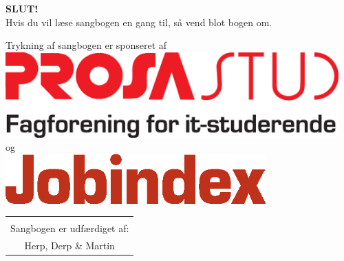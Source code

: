 \newpage
\pagestyle{empty}
\begin{center}
{\Huge \textbf{SLUT!}}\\
\vspace{4.5cm}
{\large Hvis du vil læse sangbogen en gang til, så vend blot bogen
  om.}\\

\vspace{2.5cm}

{\large Trykning af sangbogen er sponseret af \vspace{0.5cm}} \\
\includegraphics[width=0.96\textwidth]{img/prosalogo.eps} \\
\vspace{0.5cm}
og \\
\vspace{0.5cm}
\includegraphics[width=0.75\textwidth]{img/jobindex_logoKUN.eps}


\begin{tabular}{c}
\vspace{3cm}
\\
Sangbogen er udfærdiget af:\\
Herp, Derp \& Martin
\end{tabular}
\end{center}
